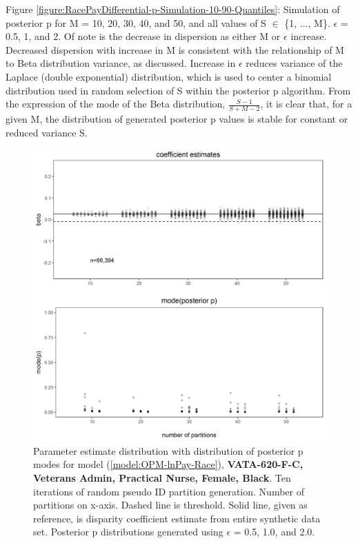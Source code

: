 \documentclass[10pt, letterpaper]{article}
\begin{document}
\begin{spacing}{1.0}
\vspace{12pt}

Figure \ref{figure:RacePayDifferential-p-Simulation-10-90-Quantiles}:  Simulation of posterior p for M = 10, 20, 30, 40, and 50, and all values of S $\in$ \{1, ..., M\}.  $\epsilon$ = 0.5, 1, and 2.  Of note is the decrease in dispersion as either M or $\epsilon$ increase.  Decreased dispersion with increase in M is consistent with the relationship of M to Beta distribution variance, as discussed.  Increase in $\epsilon$ reduces variance of the Laplace (double exponential) distribution, which is used to center a binomial distribution used in random selection of S within the posterior p algorithm.  From the expression of the mode of the Beta distribution, $\frac{S-1}{S+M-2}$, it is clear that, for a given M, the distribution of generated posterior p values is stable for constant or reduced variance S.\\

\vspace{20pt}

\begin{figure}[h]
    \centering
    \includegraphics[width=6in]{images/RacePayDifferentialBetaWithPosteriorDistribution-VATA-620-F-C.png}
    \caption{Parameter estimate distribution with distribution of posterior p modes for model (\ref{model:OPM-lnPay-Race}), \textbf{VATA-620-F-C, Veterans Admin, Practical Nurse, Female, Black}.  Ten iterations of random pseudo ID partition generation.  Number of partitions on x-axis.  Dashed line is threshold.  Solid line, given as reference, is disparity coefficient estimate from entire synthetic data set.  Posterior p distributions generated using $\epsilon$ = 0.5, 1.0, and 2.0.}
    \label{figure:RacePayDifferentialBetaWithPosteriorDistribution-VATA-620-F-C}
\end{figure}


\end{spacing}
\end{document}
